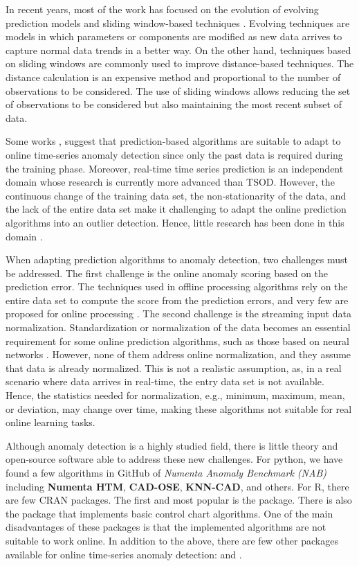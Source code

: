 \documentclass[a4paper]{article}\usepackage[]{graphicx}\usepackage[]{color}
\begin{document}
In recent years, most of the work has focused on the evolution of evolving prediction models and sliding window-based techniques \cite{a3e0f1cf080343d98cae7430cd6e43c4}. Evolving techniques are models in which parameters or components are modified as new data arrives to capture normal data trends in a better way. On the other hand, techniques based on sliding windows are commonly used to improve distance-based techniques. The distance calculation is an expensive method and proportional to the number of observations to be considered. The use of sliding windows allows reducing the set of observations to be considered but also maintaining the most recent subset of data.

Some works \cite{aggarwal_outlier}\cite{Blazquez-Garcia2020}, suggest that prediction-based algorithms are suitable to adapt to online time-series anomaly detection since only the past data is required during the training phase. Moreover, real-time time series prediction is an independent domain whose research is currently more advanced than TSOD. However, the continuous change of the training data set, the non-stationarity of the data, and the lack of the entire data set make it challenging to adapt the online prediction algorithms into an outlier detection. Hence, little research has been done in this domain  \cite{Ahmad2017}\cite{Xu2017}.

When adapting prediction algorithms to anomaly detection, two challenges must be addressed. The first challenge is the online anomaly scoring based on the prediction error. The techniques used in offline processing algorithms rely on the entire data set to compute the score from the prediction errors, and very few are proposed for online processing \cite{Ahmad2017}\cite{Buda2018}. The second challenge is the streaming input data normalization. Standardization or normalization of the data becomes an essential requirement for some online prediction algorithms, such as those based on neural networks \cite{Liang2006}\cite{Park2017}. However, none of them address online normalization, and they assume that data is already normalized. This is not a realistic assumption, as, in a real scenario where data arrives in real-time, the entry data set is not available. Hence, the statistics needed for normalization, e.g., minimum, maximum, mean, or deviation, may change over time, making these algorithms not suitable for real online learning tasks.

Although anomaly detection is a highly studied field, there is little theory and open-source software able to address these new challenges. For python, we have found a few algorithms in GitHub of \emph{Numenta Anomaly Benchmark (NAB)} \cite{7424283} including \textbf{Numenta HTM}, \textbf{CAD-OSE}, \textbf{KNN-CAD}, and others. For R, there are few CRAN packages. The first and most popular is the  package. There is also the  package that implements basic control chart algorithms. One of the main disadvantages of these packages is that the implemented algorithms are not suitable to work online. In addition to the above, there are few other packages available for online time-series anomaly detection:  and .
\end{document}
